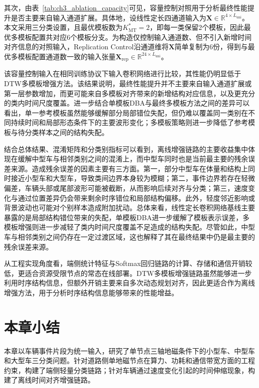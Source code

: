 \documentclass{xdupgthesis}
\begin{document}
其次，由表~\ref{tab:ch3_ablation_capacity}可见，容量控制对照用于分析最终性能提升是否主要来自输入通道扩展。具体地，设线性定长四通道输入为$\mathbf{X}\in\mathbb{R}^{4\times L_{\mathrm{uni}}}$。本文采用三分类设置，且最优模板数为$K_{\mathrm{MT}}^\ast=2$，即每一类保留2个模板，因此最优多模板配置共对应6个模板分支。为构造仅控制输入通道数、但不引入新增时间对齐信息的对照输入，Replication Control沿通道维将$\mathbf{X}$简单复制为6份，得到与最优多模板配置通道数一致的输入张量$\mathbf{X}_{\mathrm{rep}}\in\mathbb{R}^{24\times L_{\mathrm{uni}}}$。

该容量控制输入在相同训练协议下输入卷积网络进行比较，其性能仍明显低于DTW多模板增强方法。该结果说明，最终性能提升并不主要来自输入通道扩展或第一层参数增加，而更可能来自多模板对齐带来的新增结构对应信息，以及更充分的类内时间尺度覆盖。进一步结合单模板DBA与最终多模板方法之间的差异可以看出，单一参考模板虽然能够缓解部分局部错位失配，但仍难以覆盖同一类别在不同持续时间和局部形态条件下的主要波形变化；多模板策略则进一步降低了参考模板与待分类样本之间的结构失配。

结合总体结果、混淆矩阵和分类别指标可以看到，离线增强链路的主要收益集中体现在缓解中型车与相邻类别之间的混淆上，而中型车同时也是当前最主要的残余误差来源。造成残余误差的因素主要有三方面。第一，部分中型车在体量和结构上同时接近小型车和大型车，导致类间边界本身较为模糊；第二，事件边界若存在轻微偏差，车辆头部或尾部波形可能被截断，从而影响后续对齐与分类；第三，速度变化与通过位置差异仍会带来剩余时序错位和局部结构偏移。此外，轻度邻近影响或背景波动也可能对个别样本造成附加扰动。总体来看，线性定长卷积网络基线主要暴露的是局部结构错位带来的失配，单模板DBA进一步缓解了模板表示误差，多模板增强则进一步减轻了类内时间尺度覆盖不足造成的结构失配。尽管如此，中型车与相邻类别之间仍存在一定过渡区域，这也解释了其在最终结果中仍是最主要的残余误差来源。

从工程实现角度看，端侧统计特征与Softmax回归链路的计算、存储和通信开销较低，更适合资源受限节点的常态在线部署。DTW多模板增强链路虽然能够进一步利用时序结构信息，但额外开销主要来自多次动态规划对齐，因此更适合作为离线增强方法，用于分析时序结构信息能够带来的性能增益。


\section{本章小结}
\label{sec:ch3_summary}

本章以车辆事件片段为统一输入，研究了单节点三轴地磁条件下的小型车、中型车和大型车三分类问题。针对道路侧单地磁节点在算力、功耗和通信带宽方面的工程约束，构建了端侧轻量分类链路；针对车辆通过速度变化引起的时间伸缩现象，构建了离线时间对齐增强链路。
\end{document}
